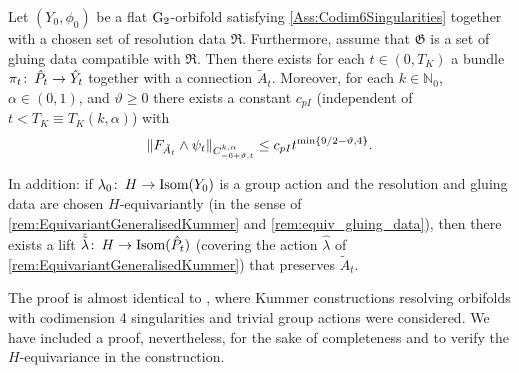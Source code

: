 \documentclass[11pt,a4paper]{scrartcl}
\newcommand{\col}{\colon \thinspace}
\newcommand{\VertWHt}[3]{\Vert_{C^{{#1},\alpha}_{{#2},t}{#3}}}
\newcommand{\G}{\textup{G}}
\numberwithin{equation}{section}
\theoremstyle{plain}
\theoremstyle{definition}
\theoremstyle{remark}
\begin{document}
\begin{proposition}\label{prop:pregluing}
Let $(Y_0,\phi_0)$ be a flat $\G_2$-orbifold satisfying \autoref{Ass:Codim6Singularities} together with a chosen set of resolution data $\mathfrak{R}$. Furthermore, assume that $\mathfrak{G}$ is a set of gluing data compatible with $\mathfrak{R}$. Then there exists for each $t\in (0,T_K)$ a bundle $\pi_t\col \hat{P}_t \to \hat{Y}_t$ together with a connection $\tilde{A}_t$. Moreover, for each $k\in \mathbb{N}_0$, $\alpha\in(0,1)$, and $\vartheta\geq 0$ there exists a constant $c_{pI}$ (independent of $t<T_K \equiv T_K(k,\alpha)$) with \[ \Vert F_{\tilde{A}_t} \wedge \psi_t \VertWHt{k}{-6+\vartheta}{} \leq c_{pI} t^{\textup{min}\{9/2-\vartheta,4\}}. \] 

In addition: if $\lambda_0 \col H \to \textup{Isom}(Y_0)$ is a group action and the resolution and gluing data are chosen $H$-equivariantly (in the sense of \autoref{rem:EquivariantGeneralisedKummer} and \autoref{rem:equiv_gluing_data}), then there exists a lift $\hat{\tilde{\lambda}}\col H \to \textup{Isom}(\hat{P}_t)$ (covering the action $\hat{\lambda}$ of \autoref{rem:EquivariantGeneralisedKummer}) that preserves $\tilde{A}_t$.
\end{proposition}
The proof is almost identical to \cite[Proof of Proposition~6.7]{Walpuski-InstantonsKummer}, where Kummer constructions resolving orbifolds with codimension 4 singularities and trivial group actions were considered. We have included a proof, nevertheless, for the sake of completeness and to verify the $H$-equivariance in the construction.
\end{document}
